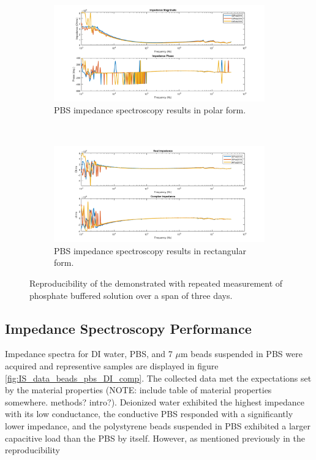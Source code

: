 \begin{figure}[h]
    \centering
    \begin{subfigure}[b]{\textwidth}
        \centering
        \includegraphics[width=\textwidth]{images/reproducibility_PBS_mag_phase.png}
        \caption{PBS impedance spectroscopy results in polar form.}
    \end{subfigure}
    \\
    \vspace{0.1 in}
    \begin{subfigure}[b]{\textwidth}
        \centering
        \includegraphics[width=\textwidth]{images/reproducibility_PBS_real_imag.png}
        \caption{PBS impedance spectroscopy results in rectangular form.}
    \end{subfigure}
    \caption{Reproducibility of the demonstrated with repeated measurement of phosphate buffered solution over a span of three days.}
    \label{fig:IS_data_reproducibility}
\end{figure}

\subsection{Impedance Spectroscopy Performance}

\par Impedance spectra for DI water, PBS, and 7 $\mu$m beads suspended in PBS were acquired and representive samples are displayed in figure \ref{fig:IS_data_beads_pbs_DI_comp}. The collected data met the expectations set by the material properties (NOTE: include table of material properties somewhere. methods? intro?). Deionized water exhibited the highest impedance with its low conductance, the conductive PBS responded with a significantly lower impedance, and the polystyrene beads suspended in PBS exhibited a larger capacitive load than the PBS by itself. However, as mentioned previously in the reproducibility 

